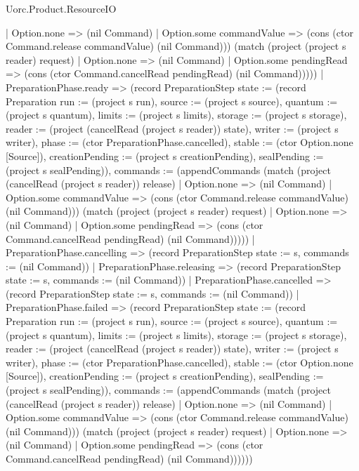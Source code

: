 \begin{lexlean}{Uorc.Product.ResourceIO}
\begin{semanticmodule}
{{      | Option.none => (nil Command)
      | Option.some commandValue => (cons (ctor Command.release commandValue) (nil Command))) (match (project (project s reader) request)
      | Option.none => (nil Command)
      | Option.some pendingRead => (cons (ctor Command.cancelRead pendingRead) (nil Command))))})
    | PreparationPhase.ready => (record PreparationStep {state := (record Preparation {run := (project s run), source := (project s source), quantum := (project s quantum), limits := (project s limits), storage := (project s storage), reader := (project (cancelRead (project s reader)) state), writer := (project s writer), phase := (ctor PreparationPhase.cancelled), stable := (ctor Option.none [Source]), creationPending := (project s creationPending), sealPending := (project s sealPending)}), commands := (appendCommands (match (project (cancelRead (project s reader)) release)
      | Option.none => (nil Command)
      | Option.some commandValue => (cons (ctor Command.release commandValue) (nil Command))) (match (project (project s reader) request)
      | Option.none => (nil Command)
      | Option.some pendingRead => (cons (ctor Command.cancelRead pendingRead) (nil Command))))})
    | PreparationPhase.cancelling => (record PreparationStep {state := s, commands := (nil Command)})
    | PreparationPhase.releasing => (record PreparationStep {state := s, commands := (nil Command)})
    | PreparationPhase.cancelled => (record PreparationStep {state := s, commands := (nil Command)})
    | PreparationPhase.failed => (record PreparationStep {state := (record Preparation {run := (project s run), source := (project s source), quantum := (project s quantum), limits := (project s limits), storage := (project s storage), reader := (project (cancelRead (project s reader)) state), writer := (project s writer), phase := (ctor PreparationPhase.cancelled), stable := (ctor Option.none [Source]), creationPending := (project s creationPending), sealPending := (project s sealPending)}), commands := (appendCommands (match (project (cancelRead (project s reader)) release)
      | Option.none => (nil Command)
      | Option.some commandValue => (cons (ctor Command.release commandValue) (nil Command))) (match (project (project s reader) request)
      | Option.none => (nil Command)
      | Option.some pendingRead => (cons (ctor Command.cancelRead pendingRead) (nil Command))))}))
}


\end{semanticmodule}
\end{lexlean}
